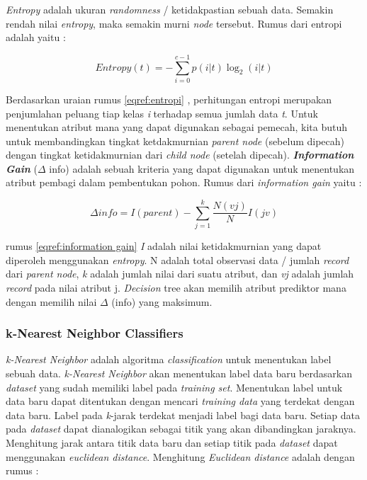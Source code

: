 \textit{Entropy} adalah ukuran \textit{randomness} / ketidakpastian sebuah data. Semakin rendah nilai \textit{entropy}, maka semakin murni \textit{node} tersebut. Rumus dari entropi adalah yaitu :

\begin{equation}
Entropy(t) = - \sum_{i=0}^{c-1} p(i|t)\log_2 (i|t)
\label{eqref:entropi}
\end{equation}

Berdasarkan uraian rumus \eqref{eqref:entropi} , perhitungan entropi merupakan penjumlahan peluang tiap kelas  \textit{i} terhadap semua jumlah data \textit{t}. Untuk menentukan atribut mana yang dapat digunakan sebagai pemecah, kita butuh untuk membandingkan tingkat ketdakmurnian \textit{parent node} (sebelum dipecah) dengan  tingkat ketidakmurnian dari \textit{child node} (setelah dipecah).  \textit{\textbf{Information Gain}} ($\Delta$ info) adalah sebuah kriteria yang dapat digunakan untuk menentukan atribut pembagi dalam pembentukan pohon. Rumus dari \textit{information gain}  yaitu : 

\begin{equation}
  \Delta info = I(parent) - \sum_{j=1}^{k} \frac{N(vj)}{N}I(jv)
  \label{eqref:information gain}
\end{equation}

rumus \eqref{eqref:information gain} \textit{I} adalah nilai ketidakmurnian yang dapat diperoleh menggunakan \textit{entropy}. N adalah total observasi data / jumlah \textit{record} dari \textit{parent node}, \textit{k} adalah jumlah nilai dari suatu atribut, dan \textit{vj} adalah jumlah \textit{record} pada nilai atribut j. \textit{Decision} tree akan memilih atribut prediktor mana dengan memilih nilai $\Delta$ (info) yang maksimum.

\subsubsection{k-Nearest Neighbor Classifiers}
 \textit{k-Nearest Neighbor} adalah algoritma \textit{classification} untuk menentukan label sebuah data. \textit{k-Nearest Neighbor} akan menentukan label data baru berdasarkan \textit{dataset} yang sudah memiliki label pada \textit{training set}. Menentukan label untuk data baru dapat ditentukan dengan mencari  \textit{training data} yang terdekat dengan data baru. Label pada \textit{k}-jarak terdekat menjadi label bagi data baru. Setiap data pada \textit{dataset} dapat dianalogikan sebagai titik yang akan dibandingkan jaraknya. Menghitung jarak antara titik data baru dan setiap titik pada \textit{dataset} dapat menggunakan \textit{euclidean distance}. Menghitung \textit{Euclidean distance} adalah dengan rumus : 

